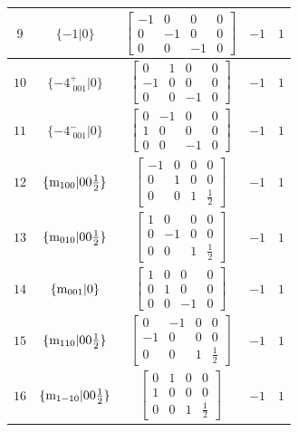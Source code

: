 \documentclass[fleqn,8pt]{jsarticle}
\begin{document}
\begin{longtable}{ccccc}
$ 9 $ & $ \{-1|0\} $ & $ \begin{bmatrix} -1 & 0 & 0 & 0 \\ 0 & -1 & 0 & 0 \\ 0 & 0 & -1 & 0 \end{bmatrix} $ & $ -1 $ & $ 1 $ \\ \hline
$ 10 $ & $ \{-4^{+}_{\,\,001}|0\} $ & $ \begin{bmatrix} 0 & 1 & 0 & 0 \\ -1 & 0 & 0 & 0 \\ 0 & 0 & -1 & 0 \end{bmatrix} $ & $ -1 $ & $ 1 $ \\ \hline
$ 11 $ & $ \{-4^{-}_{\,\,001}|0\} $ & $ \begin{bmatrix} 0 & -1 & 0 & 0 \\ 1 & 0 & 0 & 0 \\ 0 & 0 & -1 & 0 \end{bmatrix} $ & $ -1 $ & $ 1 $ \\ \hline
$ 12 $ & $ \{{\rm m}_{100}|0 0 \frac{1}{2}\} $ & $ \begin{bmatrix} -1 & 0 & 0 & 0 \\ 0 & 1 & 0 & 0 \\ 0 & 0 & 1 & \frac{1}{2} \end{bmatrix} $ & $ -1 $ & $ 1 $ \\ \hline
$ 13 $ & $ \{{\rm m}_{010}|0 0 \frac{1}{2}\} $ & $ \begin{bmatrix} 1 & 0 & 0 & 0 \\ 0 & -1 & 0 & 0 \\ 0 & 0 & 1 & \frac{1}{2} \end{bmatrix} $ & $ -1 $ & $ 1 $ \\ \hline
$ 14 $ & $ \{{\rm m}_{001}|0\} $ & $ \begin{bmatrix} 1 & 0 & 0 & 0 \\ 0 & 1 & 0 & 0 \\ 0 & 0 & -1 & 0 \end{bmatrix} $ & $ -1 $ & $ 1 $ \\ \hline
$ 15 $ & $ \{{\rm m}_{110}|0 0 \frac{1}{2}\} $ & $ \begin{bmatrix} 0 & -1 & 0 & 0 \\ -1 & 0 & 0 & 0 \\ 0 & 0 & 1 & \frac{1}{2} \end{bmatrix} $ & $ -1 $ & $ 1 $ \\ \hline
$ 16 $ & $ \{{\rm m}_{1-10}|0 0 \frac{1}{2}\} $ & $ \begin{bmatrix} 0 & 1 & 0 & 0 \\ 1 & 0 & 0 & 0 \\ 0 & 0 & 1 & \frac{1}{2} \end{bmatrix} $ & $ -1 $ & $ 1 $ \\ \hline

\end{longtable}
\end{document}
